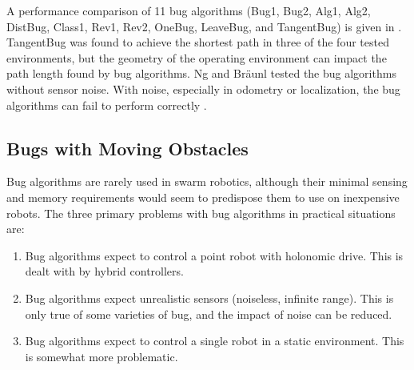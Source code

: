\documentclass[letterpaper, 10 pt, conference]{ieeeconf}  %
\begin{document}


A performance comparison of 11 bug algorithms (Bug1, Bug2, Alg1, Alg2, DistBug, Class1, Rev1, Rev2, OneBug, LeaveBug, and TangentBug) is given in \cite{ng2007performance}.
TangentBug was found to achieve the shortest path in three of the four tested environments, but the geometry of the operating environment can impact the path length found by bug algorithms. 
Ng and Br{\"a}unl tested the bug algorithms without sensor noise. 
With noise, especially in odometry or localization, the bug algorithms can fail to perform correctly \cite{mcguire2018comparative}.

\subsection{Bugs with Moving Obstacles}

Bug algorithms are rarely used in swarm robotics, although their minimal sensing and memory requirements would seem to predispose them to use on inexpensive robots. 
The three primary problems with bug algorithms in practical situations are:

\begin{enumerate}
	\item Bug algorithms expect to control a point robot with holonomic drive. This is dealt with by hybrid controllers. 
	\item Bug algorithms expect unrealistic sensors (noiseless, infinite range). This is only true of some varieties of bug, and the impact of noise can be reduced. 
	\item Bug algorithms expect to control a single robot in a static environment. This is somewhat more problematic. 
\end{enumerate}
\end{document}

